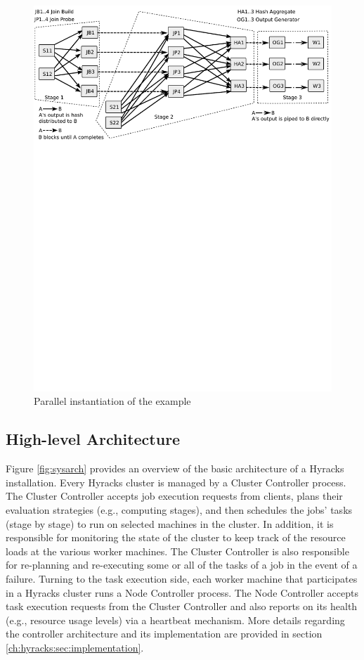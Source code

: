 \begin{figure}[htp]
\centering
\includegraphics[scale=0.7]{images/tpch-rt}
\caption{Parallel instantiation of the example}\label{fig:example01_rt}
\end{figure}

\subsection{High-level Architecture}

Figure \ref{fig:sysarch} provides an overview of the basic architecture of a Hyracks installation.
Every Hyracks cluster is managed by a Cluster Controller process.
The Cluster Controller accepts job execution requests from clients, plans their evaluation strategies (e.g., computing stages),
and then schedules the jobs' tasks (stage by stage) to run on selected machines in the cluster.
In addition, it is responsible for monitoring the state of the cluster to keep track of the resource loads at the various worker machines.
The Cluster Controller is also responsible for re-planning and re-executing some or all of the tasks of a job in the event of a failure.
Turning to the task execution side, each worker machine that participates in a Hyracks cluster runs a Node Controller process.
The Node Controller accepts task execution requests from the Cluster Controller and also reports on its health (e.g., resource usage levels)
via a heartbeat mechanism.  More details regarding the controller architecture and its implementation are provided in section \ref{ch:hyracks:sec:implementation}.

